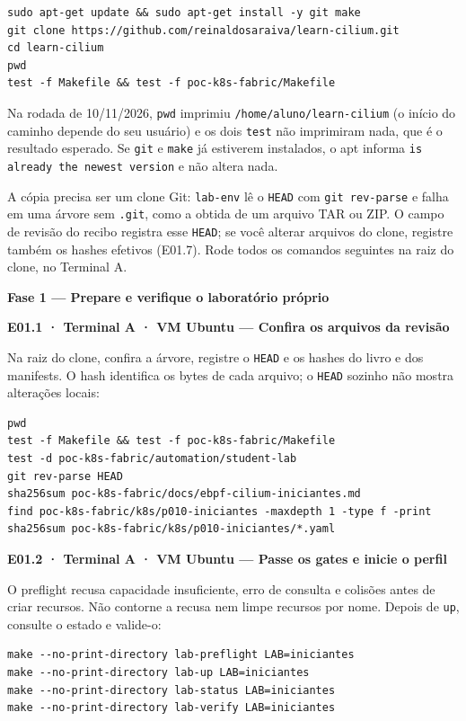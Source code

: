 \documentclass[12pt,openany,oneside,a4paper,chapter=TITLE,english,brazil]{abntex2}
\begin{document}
\begin{verbatim}
sudo apt-get update && sudo apt-get install -y git make
git clone https://github.com/reinaldosaraiva/learn-cilium.git
cd learn-cilium
pwd
test -f Makefile && test -f poc-k8s-fabric/Makefile
\end{verbatim}

Na rodada de 10/11/2026, \texttt{pwd} imprimiu \texttt{/\allowbreak{}home/\allowbreak{}aluno/\allowbreak{}learn-{}\allowbreak{}cilium} (o início do caminho depende do seu usuário) e os dois \texttt{test} não imprimiram nada, que é o resultado esperado. Se \texttt{git} e \texttt{make} já estiverem instalados, o apt informa \texttt{is already the newest version} e não altera nada.

A cópia precisa ser um clone Git: \texttt{lab-{}\allowbreak{}env} lê o \texttt{HEAD} com \texttt{git rev-{}\allowbreak{}parse} e falha em uma árvore sem \texttt{.\allowbreak{}git}, como a obtida de um arquivo TAR ou ZIP. O campo de revisão do recibo registra esse \texttt{HEAD}; se você alterar arquivos do clone, registre também os hashes efetivos (E01.7). Rode todos os comandos seguintes na raiz do clone, no Terminal A.

\textbf{Fase 1 --- Prepare e verifique o laboratório próprio}

\textbf{E01.1 · Terminal A · VM Ubuntu --- Confira os arquivos da revisão}

Na raiz do clone, confira a árvore, registre o \texttt{HEAD} e os hashes do livro e dos manifests. O hash identifica os bytes de cada arquivo; o \texttt{HEAD} sozinho não mostra alterações locais:

\begin{verbatim}
pwd
test -f Makefile && test -f poc-k8s-fabric/Makefile
test -d poc-k8s-fabric/automation/student-lab
git rev-parse HEAD
sha256sum poc-k8s-fabric/docs/ebpf-cilium-iniciantes.md
find poc-k8s-fabric/k8s/p010-iniciantes -maxdepth 1 -type f -print
sha256sum poc-k8s-fabric/k8s/p010-iniciantes/*.yaml
\end{verbatim}

\textbf{E01.2 · Terminal A · VM Ubuntu --- Passe os gates e inicie o perfil}

O preflight recusa capacidade insuficiente, erro de consulta e colisões antes de criar recursos. Não contorne a recusa nem limpe recursos por nome. Depois de \texttt{up}, consulte o estado e valide-o:

\begin{verbatim}
make --no-print-directory lab-preflight LAB=iniciantes
make --no-print-directory lab-up LAB=iniciantes
make --no-print-directory lab-status LAB=iniciantes
make --no-print-directory lab-verify LAB=iniciantes
\end{verbatim}
\end{document}
